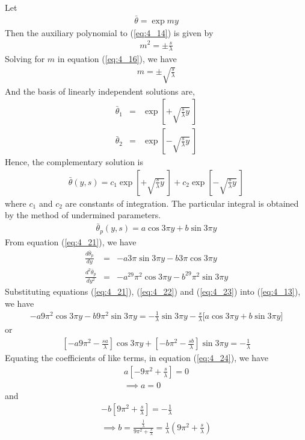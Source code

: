\documentclass[11pt]{report}
\newcommand{\sps}{\\[0.2cm]}
\newcommand{\refn}[1]{(\ref{#1})}
\newcommand{\refx}[1]{\refn{eq:#1}}
\begin{document}
	Let
	\begin{eqnarray}
		\bar{\theta} = \exp my\label{eq:4_15}
	\end{eqnarray}
	Then the auxiliary polynomial to \refx{4_14} is given by
	\begin{eqnarray}
		m^2 = \pm\frac{s}{\lambda}\label{eq:4_16}
	\end{eqnarray}
	Solving for $m$ in equation \refx{4_16}, we have
	\begin{eqnarray}
		m = \pm\sqrt{\frac{s}{\lambda}}
	\end{eqnarray}
	And the basis of linearly independent solutions are,
	\begin{eqnarray}
		\bar{\theta}_1 &=& \exp\left[+\sqrt{\frac{s}{\lambda}y}~\right]\sps
		\bar{\theta}_2 &=& \exp\left[-\sqrt{\frac{s}{\lambda}y}~\right]
	\end{eqnarray}
	Hence, the complementary solution is
	\begin{eqnarray}
		\bar{\theta}(y,s) = c_1\exp\left[+\sqrt{\frac{s}{\lambda}y}~\right] + c_2 \exp\left[-\sqrt{\frac{s}{\lambda}y}~\right]\label{eq:4_20}
	\end{eqnarray}
	where $c_1$ and $c_2$ are constants of integration. The particular integral is obtained by the method of undermined parameters.
	\begin{eqnarray}
		\bar{\theta}_p(y,s) = a\cos 3\pi y + b\sin 3\pi y\label{eq:4_21}
	\end{eqnarray}
	From equation \refx{4_21}, we have
	\begin{eqnarray}
		\frac{d\bar{\theta}_p}{dy} &=& -a3\pi\sin 3\pi y - b3\pi\cos 3\pi y\label{eq:4_22}\sps
		\frac{d^2\bar{\theta}_p}{dy^2} &=& -a^29\pi^2\cos 3\pi y - b^29\pi^2\sin 3\pi y\label{eq:4_23}
	\end{eqnarray}
	Substituting equations \refx{4_21}, \refx{4_22} and \refx{4_23} into \refx{4_13}, we have
	\begin{gather*}
		-a9\pi^2\cos 3\pi y - b9\pi^2\sin 3\pi y = -\frac{1}{\lambda}\sin 3\pi y - \frac{s}{\lambda}\Big[a\cos 3\pi y + b\sin 3\pi y\Big]
	\end{gather*}
	or
	\begin{gather}
		\left[-a9\pi^2 - \frac{sa}{\lambda}\right]\cos 3\pi y + \left[-b\pi^2 - \frac{sb}{\lambda}\right]\sin 3\pi y = -\frac{1}{\lambda}\label{eq:4_24}
	\end{gather}
	Equating the coefficients of like terms, in equation \refx{4_24}, we have
	\begin{gather*}
		a\left[-9\pi^2 + \frac{s}{\lambda}\right] = 0\sps
		\implies a = 0
	\end{gather*}
	and
	\begin{gather*}
		-b\left[9\pi^2 + \frac{s}{\lambda}\right] = -\frac{1}{\lambda}\sps
		\implies b = \frac{\frac{1}{\lambda}}{9\pi^2 + \frac{s}{\lambda}} = \frac{1}{\lambda}(9\pi^2 + \frac{s}{\lambda})
	\end{gather*}
	
\end{document}
